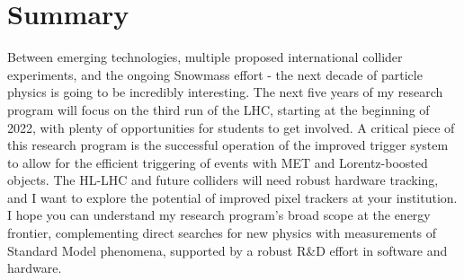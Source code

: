 \documentclass[10pt,a4paper,sans]{moderncv/moderncv} %
\begin{document}
\section{Summary}
Between emerging technologies, multiple proposed international collider experiments, and the ongoing Snowmass effort - the next decade of particle physics is going to be incredibly interesting. The next five years of my research program will focus on the third run of the LHC, starting at the beginning of 2022, with plenty of opportunities for students to get involved. A critical piece of this research program is the successful operation of the improved trigger system to allow for the efficient triggering of events with MET and Lorentz-boosted objects. The HL-LHC and future colliders will need robust hardware tracking, and I want to explore the potential of improved pixel trackers at your institution.  I hope you can understand my research program's broad scope at the energy frontier, complementing direct searches for new physics with measurements of Standard Model phenomena, supported by a robust R\&D effort in software and hardware.

\printbibliography
\end{document}
